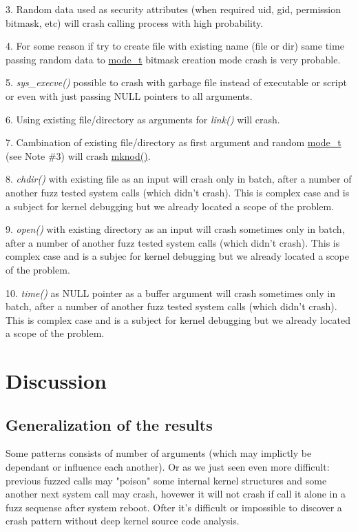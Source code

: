 \documentclass[twoside]{article}
\begin{document}
\begin{multicols}{2}
3. Random data used as security attributes (when required uid, gid, permission bitmask, etc) will crash calling process with high probability.

4. For some reason if try to create file with existing name (file or dir) same time passing random data to \underline{mode\_t} bitmask creation mode crash is very probable.

5. \emph{sys\_execve()} possible to crash with garbage file instead of executable or script or even with just passing NULL pointers to all arguments.

6. Using existing file/directory as arguments for \emph{link()} will crash.

7. Cambination of existing file/directory as first argument and random \underline{mode\_t} (see Note \#3) will crash \underline{mknod()}.

8. \emph{chdir()} with existing file as an input will crash only in batch,   after a number of another fuzz tested system calls (which didn't crash). This is complex case and is a subject for kernel debugging but we already located a scope of the problem.  

9. \emph{open()} with existing directory as an input will crash sometimes only in batch, after a number of another fuzz tested system calls (which didn't crash). This is complex case and is a subjec for kernel debugging but we already located a scope of the problem.  

10. \emph{time()} as NULL pointer as a buffer argument will crash sometimes only in batch, after a number of another fuzz tested system calls (which didn't crash). This is complex case and is a subject for kernel debugging but we already located a scope of the problem.



\section{Discussion}

\subsection{Generalization of the results}

Some patterns consists of number of arguments (which may implictly be dependant or influence each another). Or as we just seen even more difficult: previous fuzzed calls may "poison" some internal kernel structures and some another next system call may crash, hovewer it will not crash if call it alone in a fuzz sequense after system reboot. Ofter it's difficult or impossible to discover a crash pattern without deep kernel source code analysis.


\end{multicols}
\end{document}
